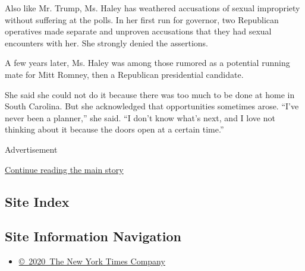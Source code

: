 Also like Mr. Trump, Ms. Haley has weathered accusations of sexual
impropriety without suffering at the polls. In her first run for
governor, two Republican operatives made separate and unproven
accusations that they had sexual encounters with her. She strongly
denied the assertions.

A few years later, Ms. Haley was among those rumored as a potential
running mate for Mitt Romney, then a Republican presidential candidate.

She said she could not do it because there was too much to be done at
home in South Carolina. But she acknowledged that opportunities
sometimes arose. ``I've never been a planner,'' she said. ``I don't know
what's next, and I love not thinking about it because the doors open at
a certain time.''

Advertisement

\protect\hyperlink{after-bottom}{Continue reading the main story}

\hypertarget{site-index}{%
\subsection{Site Index}\label{site-index}}

\hypertarget{site-information-navigation}{%
\subsection{Site Information
Navigation}\label{site-information-navigation}}

\begin{itemize}
\tightlist
\item
  \href{https://help.nytimes.com/hc/en-us/articles/115014792127-Copyright-notice}{©~2020~The
  New York Times Company}
\end{itemize}

